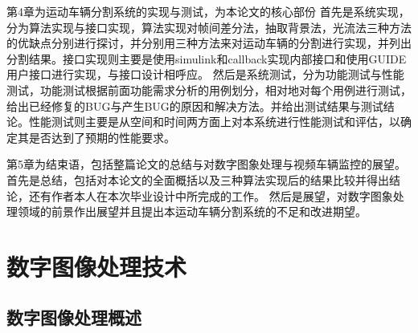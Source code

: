 \documentclass[18pt, twoside, a4paper, dvipdfm]{book}
\begin{document}
第4章为运动车辆分割系统的实现与测试，为本论文的核心部份
首先是系统实现，分为算法实现与接口实现，算法实现对帧间差分法，抽取背景法，光流法三种方法的优缺点分别进行探讨，并分别用三种方法来对运动车辆的分割进行实现，并列出分割结果。接口实现则主要是使用simulink和callback实现内部接口和使用GUIDE用户接口进行实现，与接口设计相呼应。
然后是系统测试，分为功能测试与性能测试，功能测试根据前面功能需求分析的用例划分，相对地对每个用例进行测试，给出已经修复的BUG与产生BUG的原因和解决方法。并给出测试结果与测试结论。性能测试则主要是从空间和时间两方面上对本系统进行性能测试和评估，以确定其是否达到了预期的性能要求。

第5章为结束语，包括整篇论文的总结与对数字图象处理与视频车辆监控的展望。
首先是总结，包括对本论文的全面概括以及三种算法实现后的结果比较并得出结论，还有作者本人在本次毕业设计中所完成的工作。
然后是展望，对数字图象处理领域的前景作出展望并且提出本运动车辆分割系统的不足和改进期望。

\chapter{数字图像处理技术}
\section{数字图像处理概述}
\end{document}
